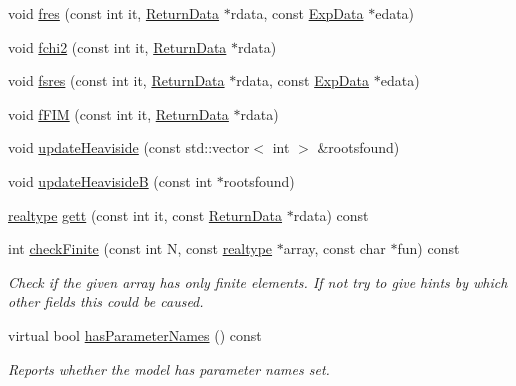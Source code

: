 \begin{DoxyCompactItemize}
void \mbox{\hyperlink{classamici_1_1_model_a991a9aab9f325625a35179fa601fa426}{fres}} (const int it, \mbox{\hyperlink{classamici_1_1_return_data}{Return\+Data}} $\ast$rdata, const \mbox{\hyperlink{classamici_1_1_exp_data}{Exp\+Data}} $\ast$edata)
\item 
void \mbox{\hyperlink{classamici_1_1_model_aaf1dc93d4591b179951824fc3b750646}{fchi2}} (const int it, \mbox{\hyperlink{classamici_1_1_return_data}{Return\+Data}} $\ast$rdata)
\item 
void \mbox{\hyperlink{classamici_1_1_model_a2a774934ab3b0a22a706f6328dd95597}{fsres}} (const int it, \mbox{\hyperlink{classamici_1_1_return_data}{Return\+Data}} $\ast$rdata, const \mbox{\hyperlink{classamici_1_1_exp_data}{Exp\+Data}} $\ast$edata)
\item 
void \mbox{\hyperlink{classamici_1_1_model_aba7a1237e503813d9ec7ca56413f1e1d}{f\+F\+IM}} (const int it, \mbox{\hyperlink{classamici_1_1_return_data}{Return\+Data}} $\ast$rdata)
\item 
void \mbox{\hyperlink{classamici_1_1_model_ae053072690046bd24225447de93a9e84}{update\+Heaviside}} (const std\+::vector$<$ int $>$ \&rootsfound)
\item 
void \mbox{\hyperlink{classamici_1_1_model_a430edd546832d0abbea6472eb7e43da8}{update\+HeavisideB}} (const int $\ast$rootsfound)
\item 
\mbox{\hyperlink{namespaceamici_a1bdce28051d6a53868f7ccbf5f2c14a3}{realtype}} \mbox{\hyperlink{classamici_1_1_model_a09e0a747a99fb59657e71690ce69726b}{gett}} (const int it, const \mbox{\hyperlink{classamici_1_1_return_data}{Return\+Data}} $\ast$rdata) const
\item 
int \mbox{\hyperlink{classamici_1_1_model_a4c38f5beea9e36aa20a089307edb5fed}{check\+Finite}} (const int N, const \mbox{\hyperlink{namespaceamici_a1bdce28051d6a53868f7ccbf5f2c14a3}{realtype}} $\ast$array, const char $\ast$fun) const
\begin{DoxyCompactList}\small\item\em Check if the given array has only finite elements. If not try to give hints by which other fields this could be caused. \end{DoxyCompactList}\item 
virtual bool \mbox{\hyperlink{classamici_1_1_model_a87eb819581d1ca627e5d5ab35ae8add9}{has\+Parameter\+Names}} () const
\begin{DoxyCompactList}\small\item\em Reports whether the model has parameter names set. \end{DoxyCompactList}\item 

\end{DoxyCompactItemize}
